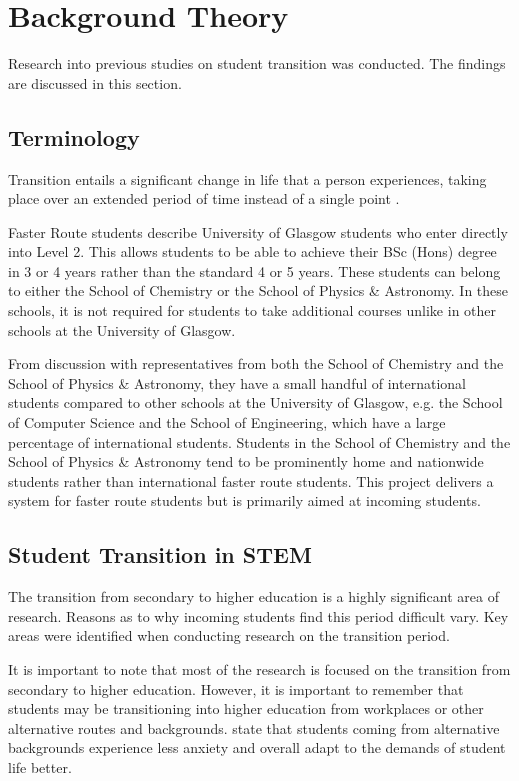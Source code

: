 \documentclass{l4proj}
\begin{document}
\section{Background Theory}
Research into previous studies on student transition was conducted. The findings are discussed in this section.

\subsection{Terminology}
Transition entails a significant change in life that a person experiences,  taking place over an extended period of time instead of a single point \citep{thompson2021navigating}.

Faster Route students describe University of Glasgow students who enter directly into Level 2. This allows students to be able to achieve their BSc (Hons) degree in 3 or 4 years rather than the standard 4 or 5 years. These students can belong to either the School of Chemistry or the School of Physics \& Astronomy. In these schools,  it is not required for students to take additional courses unlike in other schools at the University of Glasgow.

From discussion with representatives from both the School of Chemistry and the School of Physics \& Astronomy,  they have a small handful of international students compared to other schools at the University of Glasgow,  e.g. the School of Computer Science and the School of Engineering,  which have a large percentage of international students. Students in the School of Chemistry and the School of Physics \& Astronomy tend to be prominently home and nationwide students rather than international faster route students. This project delivers a system for faster route students but is primarily aimed at incoming students.

\subsection{Student Transition in STEM}
The transition from secondary to higher education is a highly significant area of research. Reasons as to why incoming students find this period difficult vary. Key areas were identified when conducting research on the transition period.

It is important to note that most of the research is focused on the transition from secondary to higher education. However,  it is important to remember that students may be transitioning into higher education from workplaces or other alternative routes and backgrounds. \citet{shankland2010student} state that students coming from alternative backgrounds experience less anxiety and overall adapt to the demands of student life better.
\end{document}
